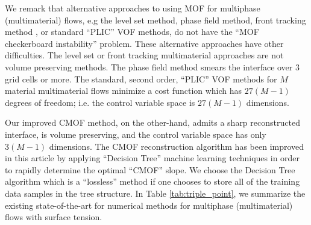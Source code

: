 \documentclass[]{article}
\begin{document}
We remark that alternative approaches to using MOF for multiphase 
(multimaterial)
flows, e.g the level set 
method\cite{smith2002projection,shetabivash2020multiple,starinshak2014new}, 
phase field method\cite{HUANG2022110795}, 
front tracking method \cite{vu2015numerical},
or standard ``PLIC'' VOF 
methods\cite{ancellin2022extension,schofield2008material,schofield2009second}, 
do not have the
``MOF checkerboard instability'' problem.  These alternative approaches
have other difficulties.  The level set or front tracking
multimaterial 
approaches\cite{smith2002projection,shetabivash2020multiple,starinshak2014new,vu2015numerical} 
are not volume preserving methods.  
The phase field method\cite{HUANG2022110795} 
smears the interface over 3 grid
cells or more.  The standard, second order, ``PLIC'' VOF methods for 
$M$ material multimaterial 
flows\cite{ancellin2022extension,schofield2008material,schofield2009second} 
minimize a cost function which has $27(M-1)$ 
degrees of freedom; i.e. the control variable space 
is $27(M-1)$ dimensions.

Our improved CMOF method, on the other-hand, admits a sharp reconstructed
interface, is volume preserving, and the control variable space has only
$3(M-1)$ dimensions.  The CMOF reconstruction algorithm has been 
improved in this article by applying ``Decision Tree'' 
machine learning techniques 
in order to rapidly determine the optimal ``CMOF'' slope.
We choose the Decision Tree algorithm\cite{breiman1984classification} which is 
a ``lossless'' method if one chooses to store all of the training
data samples in the tree structure.  
In Table \ref{tab:triple_point}, we summarize the
existing state-of-the-art for numerical methods for 
multiphase (multimaterial)
flows with surface tension.
\end{document}
